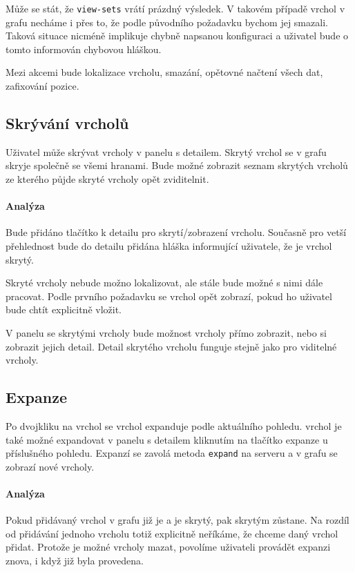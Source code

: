 Může se stát, že \texttt{view-sets} vrátí prázdný výsledek. V takovém případě vrchol v grafu necháme i přes to, že podle původního požadavku bychom jej smazali. Taková situace nicméně implikuje chybně napsanou konfiguraci a uživatel bude o tomto informován chybovou hláškou.

Mezi akcemi bude lokalizace vrcholu, smazání, opětovné načtení všech dat, zafixování pozice.

\subsection*{Skrývání vrcholů}
Uživatel může skrývat vrcholy v panelu s detailem. Skrytý vrchol se v grafu skryje společně se všemi hranami. Bude možné zobrazit seznam skrytých vrcholů ze kterého půjde skryté vrcholy opět zviditelnit.

\paragraph{Analýza} Bude přidáno tlačítko k detailu pro skrytí/zobrazení vrcholu. Současně pro vetší přehlednost bude do detailu přidána hláška informující uživatele, že je vrchol skrytý.

Skryté vrcholy nebude možno lokalizovat, ale stále bude možné s nimi dále pracovat. Podle prvního požadavku se vrchol opět zobrazí, pokud ho uživatel bude chtít explicitně vložit.

V panelu se skrytými vrcholy bude možnost vrcholy přímo zobrazit, nebo si zobrazit jejich detail. Detail skrytého vrcholu funguje stejně jako pro viditelné vrcholy.

\subsection*{Expanze}
Po dvojkliku na vrchol se vrchol expanduje podle aktuálního pohledu. vrchol je také možné expandovat v panelu s detailem kliknutím na tlačítko expanze u příslušného pohledu. Expanzí se zavolá metoda \texttt{expand} na serveru a v grafu se zobrazí nové vrcholy.

\paragraph{Analýza} Pokud přidávaný vrchol v grafu již je a je skrytý, pak skrytým zůstane. Na rozdíl od přidávání jednoho vrcholu totiž explicitně neříkáme, že chceme daný vrchol přidat. Protože je možné vrcholy mazat, povolíme uživateli provádět expanzi znova, i když již byla provedena.

